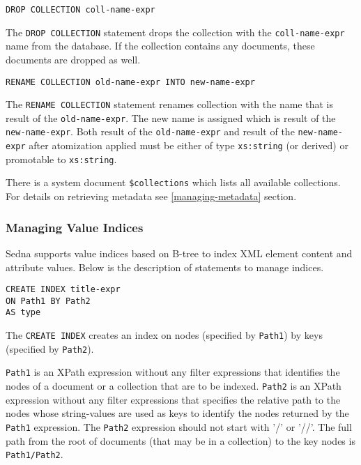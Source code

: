 \documentclass[a4paper,12pt]{article}
\begin{document}
\begin{verbatim}
DROP COLLECTION coll-name-expr
\end{verbatim}

The \verb!DROP COLLECTION! statement drops the collection with the
\verb!coll-name-expr! name from the database. If the collection contains any
documents, these documents are dropped as well.

\begin{verbatim}
RENAME COLLECTION old-name-expr INTO new-name-expr
\end{verbatim}

The \verb!RENAME COLLECTION! statement renames collection with the name that is
result of the \verb!old-name-expr!. The new name is assigned which is result of
the \verb!new-name-expr!. Both result of the \verb!old-name-expr! and result of
the \verb!new-name-expr! after atomization applied must be either of type
\verb!xs:string! (or derived) or promotable to \verb!xs:string!.

There is a system document \verb!$collections! which lists all available
collections. For details on retrieving metadata see \ref{managing-metadata}
section.


\subsubsection{Managing Value Indices}
\label{sec:managing-value-indices}

Sedna supports value indices based on B-tree to index XML element content and
attribute values. Below is the description of statements to manage indices.

\begin{verbatim}
CREATE INDEX title-expr
ON Path1 BY Path2
AS type
\end{verbatim}

The \verb!CREATE INDEX! creates an index on nodes (specified by \verb!Path1!) by
keys (specified by \verb!Path2!).

\verb!Path1! is an XPath expression without any filter expressions that
identifies the nodes of a document or a collection that are to be indexed.
\verb!Path2! is an XPath expression without any filter expressions that
specifies the relative path to the nodes whose string-values are used as keys to
identify the nodes returned by the \verb!Path1! expression. The \verb!Path2!
expression should not start with '/' or '//'. The full path from the root of
documents (that may be in a collection) to the key nodes is \verb!Path1/Path2!.
\end{document}
